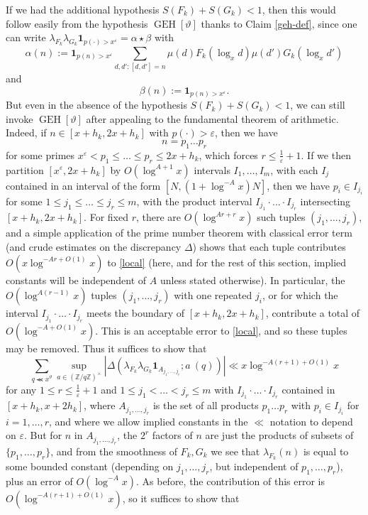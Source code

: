 \documentclass{bmcart}
\DeclareMathOperator*\GEH{GEH}
\theoremstyle{plain}
\theoremstyle{definition}
\newcommand\Z{\mathbb{Z}}
\newcommand\eps{\varepsilon}
\renewcommand{\lessapprox}{\llcurly}
\newcommand{\onef}{\mathbf{1}}
\begin{document}
If we had the additional hypothesis $S(F_k) + S(G_k) < 1$, then this would follow easily from the hypothesis $\GEH[\vartheta]$ thanks to Claim \ref{geh-def}, since one can write $\lambda_{F_k} \lambda_{G_k} \onef_{p(\cdot) > x^\eps} = \alpha \star \beta$ with
$$ \alpha(n) := \onef_{p(n) > x^\eps} \sum_{d,d': [d,d'] = n} \mu(d) F_k(\log_x d) \mu(d') G_k(\log_x d')$$
and
$$ \beta(n) := \onef_{p(n) > x^\eps}.$$
But even in the absence of the hypothesis $S(F_k) + S(G_k) < 1$, we can still invoke $\GEH[\vartheta]$ after appealing to the fundamental theorem of arithmetic.  Indeed, if $n \in [x+h_k,2x+h_k]$ with $p(\cdot) > \eps$, then we have
$$ n = p_1 \dots p_r$$
for some primes $x^\eps < p_1 \leq \dots \leq p_r \leq 2x+h_k$, which forces $r \leq \frac{1}{\eps}+1$.  If we then partition $[x^\eps,2x+h_k]$ by $O( \log^{A+1} x )$ intervals $I_1,\dots,I_m$, with each $I_j$ contained in an interval of the form $[N, (1+\log^{-A} x) N]$, then we have $p_i \in I_{j_i}$ for some $1 \leq j_1 \leq \dots \leq j_r \leq m$, with the product interval $I_{j_1} \cdot \dots \cdot I_{j_r}$ intersecting $[x+h_k, 2x+h_k]$.  For fixed $r$, there are $O( \log^{Ar+r} x)$ such tuples $(j_1,\dots,j_r)$, and a simple application of the prime number theorem with classical error term (and crude estimates on the discrepancy $\Delta$) shows that each tuple contributes $O( x \log^{-Ar+O(1)} x)$ to \eqref{local} (here, and for the rest of this section, implied constants will be independent of $A$ unless stated otherwise). In particular, the $O(\log^{A(r-1)}{x})$ tuples $(j_1,\dots,j_r)$ with one repeated $j_i$, or for which the interval $I_{j_1} \cdot \dots \cdot I_{j_r}$ meets the boundary of $[x+h_k, 2x+h_k]$, contribute a total of $O(\log^{-A+O(1)}{x})$. This is an acceptable error to \eqref{local}, and so these tuples may be removed.  Thus it suffices to show that 
$$
\sum_{q \lessapprox x^\vartheta} \sup_{a \in (\Z/q\Z)^\times} |\Delta( \lambda_{F_k} \lambda_{G_k} \onef_{A_{j_1,\dots,j_r}};  a\ (q))| \ll x \log^{-A(r+1)+O(1)} x
$$
for any $1 \leq r \leq \frac{1}{\eps}+1$ and $1 \leq j_1 < \dots < j_r \leq m$ with $I_{j_1} \cdot \dots \cdot I_{j_r}$ contained in $[x+h_k,x+2h_k]$, where $A_{j_1,\dots,j_r}$ is the set of all products $p_1 \dots p_r$ with $p_i \in I_{j_i}$ for $i=1,\dots,r$, and where we allow implied constants in the $\ll$ notation to depend on $\eps$.  But for $n$ in $A_{j_1,\dots,j_r}$, the $2^r$ factors of $n$ are just the products of subsets of $\{p_1,\dots,p_r\}$, and from the smoothness of $F_k,G_k$ we see that $\lambda_{F_k}(n)$ is equal to some bounded constant (depending on $j_1,\dots,j_r$, but independent of $p_1,\dots,p_r$), plus an error of $O(\log^{-A} x)$.  As before, the contribution of this error is $O( \log^{-A(r+1)+O(1)} x)$, so it suffices to show that
\end{document}
